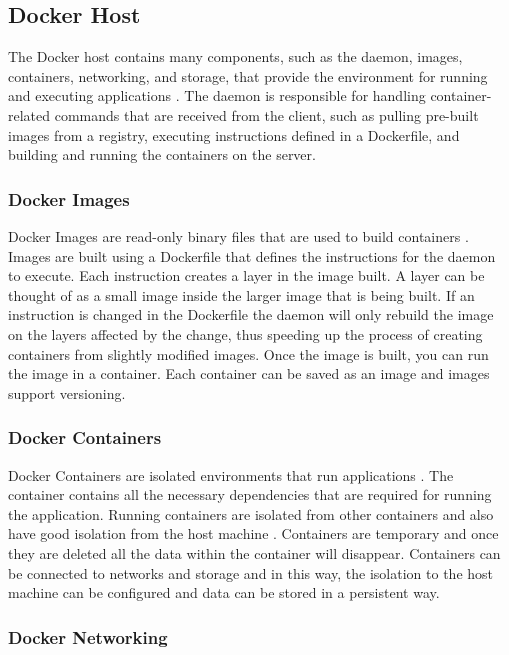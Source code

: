 \documentclass[fleqn,12pt]{olplainarticle}
\begin{document}
\subsection{Docker Host}

The Docker host contains many components, such as the daemon, images, containers, networking, and storage, that provide the environment for running and executing applications \citep{aquasec:docker_architecture}. The daemon is responsible for handling container-related commands that are received from the client, such as pulling pre-built images from a registry, executing instructions defined in a Dockerfile, and building and running the containers on the server.

\subsubsection{Docker Images}

Docker Images are read-only binary files that are used to build containers \citep{docker:overview}. Images are built using a Dockerfile that defines the instructions for the daemon to execute. Each instruction creates a layer in the image built. A layer can be thought of as a small image inside the larger image that is being built. If an instruction is changed in the Dockerfile the daemon will only rebuild the image on the layers affected by the change, thus speeding up the process of creating containers from slightly modified images. Once the image is built, you can run the image in a container. Each container can be saved as an image and images support versioning.

\subsubsection{Docker Containers}

Docker Containers are isolated environments that run applications \citep{aquasec:docker_architecture}. The container contains all the necessary dependencies that are required for running the application. Running containers are isolated from other containers and also have good isolation from the host machine \citep{docker:security}. Containers are temporary and once they are deleted all the data within the container will disappear. Containers can be connected to networks and storage and in this way, the isolation to the host machine can be configured and data can be stored in a persistent way.

\subsubsection{Docker Networking}
\end{document}
